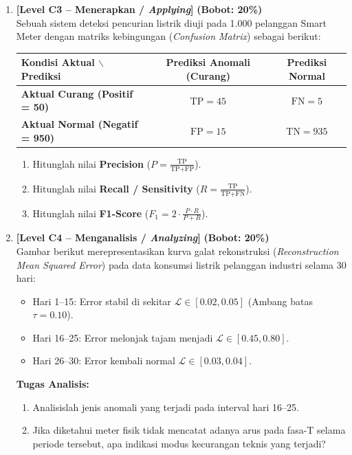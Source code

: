 \documentclass[11pt,a4paper]{article}
\begin{document}
\begin{enumerate}[leftmargin=1.5em, label=\textbf{Soal \arabic*.}]
    \item \textbf{[Level C3 -- Menerapkan / \textit{Applying}]} \hfill \textbf{(Bobot: 20\%)} \\
    Sebuah sistem deteksi pencurian listrik diuji pada 1.000 pelanggan Smart Meter dengan matriks kebingungan (\textit{Confusion Matrix}) sebagai berikut:
    \begin{center}
    \begin{tabular}{|l|c|c|}
    \hline
    \rowcolor{boxbg}
    \textbf{Kondisi Aktual $\backslash$ Prediksi} & \textbf{Prediksi Anomali (Curang)} & \textbf{Prediksi Normal} \\ \hline
    \textbf{Aktual Curang (Positif = 50)} & $\text{TP} = 45$ & $\text{FN} = 5$ \\ \hline
    \textbf{Aktual Normal (Negatif = 950)} & $\text{FP} = 15$ & $\text{TN} = 935$ \\ \hline
    \end{tabular}
    \end{center}
    \begin{enumerate}[label=\alph*.]
        \item Hitunglah nilai \textbf{Precision} ($P = \frac{\text{TP}}{\text{TP} + \text{FP}}$).
        \item Hitunglah nilai \textbf{Recall / Sensitivity} ($R = \frac{\text{TP}}{\text{TP} + \text{FN}}$).
        \item Hitunglah nilai \textbf{F1-Score} ($F_1 = 2 \cdot \frac{P \cdot R}{P + R}$).
    \end{enumerate}

    \newpage

    \item \textbf{[Level C4 -- Menganalisis / \textit{Analyzing}]} \hfill \textbf{(Bobot: 20\%)} \\
    Gambar berikut merepresentasikan kurva galat rekonstruksi (\textit{Reconstruction Mean Squared Error}) pada data konsumsi listrik pelanggan industri selama 30 hari:
    \begin{itemize}
        \item Hari 1--15: Error stabil di sekitar $\mathcal{L} \in [0.02, 0.05]$ (Ambang batas $\tau = 0.10$).
        \item Hari 16--25: Error melonjak tajam menjadi $\mathcal{L} \in [0.45, 0.80]$.
        \item Hari 26--30: Error kembali normal $\mathcal{L} \in [0.03, 0.04]$.
    \end{itemize}
    \textbf{Tugas Analisis:}
    \begin{enumerate}[label=\alph*.]
        \item Analisislah jenis anomali yang terjadi pada interval hari 16--25.
        \item Jika diketahui meter fisik tidak mencatat adanya arus pada fasa-T selama periode tersebut, apa indikasi modus kecurangan teknis yang terjadi?
    \end{enumerate}


\end{enumerate}
\end{document}
